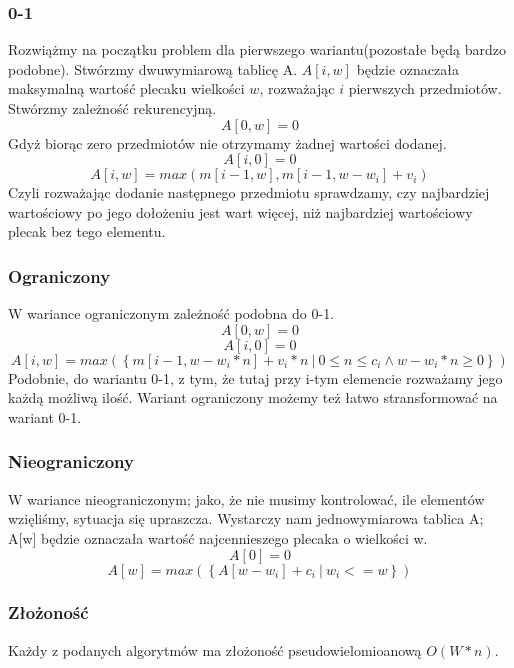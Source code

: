 \subsubsection{0-1}
Rozwiążmy na początku problem dla pierwszego wariantu(pozostałe będą bardzo podobne).
Stwórzmy dwuwymiarową tablicę A.
$A[i, w]$ będzie oznaczała maksymalną wartość plecaku wielkości $w$, rozważając $i$ pierwszych przedmiotów.
Stwórzmy zależność rekurencyjną.
\[A[0, w] = 0\]
Gdyż biorąc zero przedmiotów nie otrzymamy żadnej wartości dodanej.
\[A[i, 0] = 0\]
\[A[i, w] = max(m[i - 1, w], m[i - 1, w - w_i] + v_i)\]
Czyli rozważając dodanie następnego przedmiotu sprawdzamy, czy najbardziej wartościowy po jego dołożeniu jest wart więcej, niż najbardziej wartościowy plecak bez tego elementu.

\subsubsection{Ograniczony}
W wariance ograniczonym zależność podobna do 0-1.
\[A[0, w] = 0\]
\[A[i, 0] = 0\]
\[A[i, w] = max(\left \{ m[i - 1, w - w_i * n] + v_i * n ~|~ 0 \leq n \leq c_i \wedge w - w_i * n \geq 0 \right \})\]
Podobnie, do wariantu 0-1, z tym, że tutaj przy i-tym elemencie rozważamy jego każdą możliwą ilość.
Wariant ograniczony możemy też łatwo stransformować na wariant 0-1.

\subsubsection{Nieograniczony}
W wariance nieograniczonym; jako, że nie musimy kontrolować, ile elementów wzięliśmy, sytuacja się upraszcza.
Wystarczy nam jednowymiarowa tablica A; A[w] będzie oznaczała wartość najcennieszego plecaka o wielkości w.
\[A[0] = 0\]
\[A[w] = max(\left \{ A[w - w_i] + c_i ~|~ w_i <= w \right \})\]

\subsubsection{Złożoność}
Każdy z podanych algorytmów ma złożoność pseudowielomioanową $O(W * n)$.
